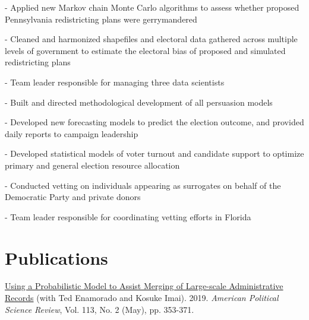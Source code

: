 \documentclass[]{deedy-resume-openfont}
\begin{document}
\begin{tightemize}
\item[-] Applied new Markov chain Monte Carlo algorithms to assess whether proposed Pennsylvania redistricting plans were gerrymandered
\item[-] Cleaned and harmonized shapefiles and electoral data gathered across multiple levels of government to estimate the electoral bias of proposed and simulated redistricting plans
\end{tightemize}
\sectionsep

\begin{tightemize}
\item[-] Team leader responsible for managing three data scientists
\item[-] Built and directed methodological development of all persuasion models
\item[-] Developed new forecasting models to predict the election outcome, and provided daily reports to campaign leadership
\item[-] Developed statistical models of voter turnout and candidate support to optimize primary and general election resource allocation
\end{tightemize}
\sectionsep

\begin{tightemize}
\item[-] Conducted vetting on individuals appearing as surrogates on behalf of the Democratic Party and private donors
\item[-] Team leader responsible for coordinating vetting efforts in Florida
\end{tightemize}
\sectionsep

\section{Publications}
\href{https://imai.fas.harvard.edu/research/linkage.html}{Using a Probabilistic Model to Assist Merging of Large-scale Administrative Records} (with Ted Enamorado and Kosuke Imai). 2019. \textit{American Political Science Review}, Vol. 113, No. 2 (May), pp. 353-371.\\\vspace{2mm}
\end{document}
